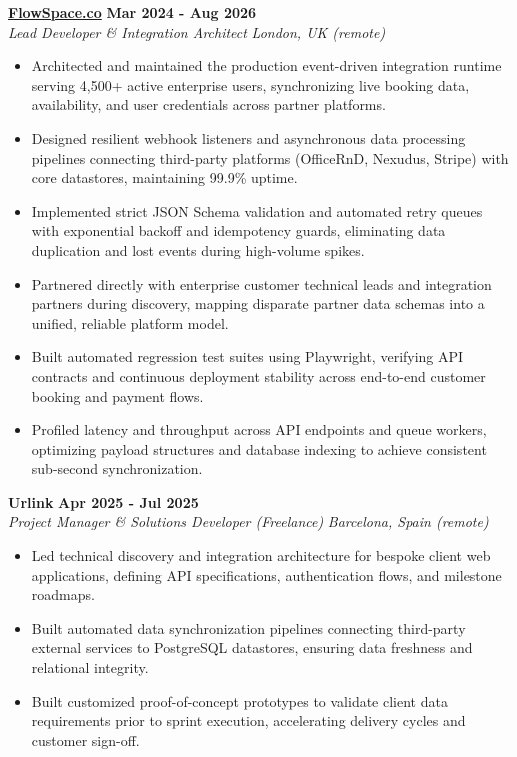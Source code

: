 \documentclass[10pt,a4paper]{article}
\newcommand{\role}[4]{%
  \textbf{#1} \hfill \textbf{#2}\\[1pt]%
  \textit{#3} \hfill \textit{#4}\\[2pt]%
}
\begin{document}
\role{\href{https://flowspace.co}{FlowSpace.co}}{Mar 2024 - Aug 2026}{Lead Developer \& Integration Architect}{London, UK (remote)}
\begin{itemize}
  \item Architected and maintained the production event-driven integration runtime serving 4,500+ active enterprise users, synchronizing live booking data, availability, and user credentials across partner platforms.
  \item Designed resilient webhook listeners and asynchronous data processing pipelines connecting third-party platforms (OfficeRnD, Nexudus, Stripe) with core datastores, maintaining 99.9\% uptime.
  \item Implemented strict JSON Schema validation and automated retry queues with exponential backoff and idempotency guards, eliminating data duplication and lost events during high-volume spikes.
  \item Partnered directly with enterprise customer technical leads and integration partners during discovery, mapping disparate partner data schemas into a unified, reliable platform model.
  \item Built automated regression test suites using Playwright, verifying API contracts and continuous deployment stability across end-to-end customer booking and payment flows.
  \item Profiled latency and throughput across API endpoints and queue workers, optimizing payload structures and database indexing to achieve consistent sub-second synchronization.
\end{itemize}

\role{Urlink}{Apr 2025 - Jul 2025}{Project Manager \& Solutions Developer (Freelance)}{Barcelona, Spain (remote)}
\begin{itemize}
  \item Led technical discovery and integration architecture for bespoke client web applications, defining API specifications, authentication flows, and milestone roadmaps.
  \item Built automated data synchronization pipelines connecting third-party external services to PostgreSQL datastores, ensuring data freshness and relational integrity.
  \item Built customized proof-of-concept prototypes to validate client data requirements prior to sprint execution, accelerating delivery cycles and customer sign-off.
\end{itemize}
\end{document}
